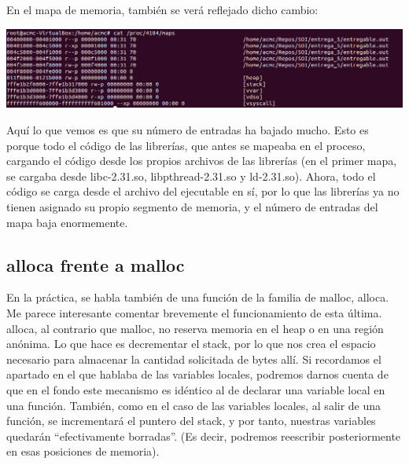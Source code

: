 \documentclass[a4paper]{article}
\begin{document}
En el mapa de memoria, también se verá reflejado dicho cambio:

\includegraphics[scale=0.408]{Captura_estatico.png}

Aquí lo que vemos es que su número de entradas ha bajado mucho. Esto es porque todo el código de las librerías, que antes se mapeaba en el proceso, cargando el código desde los propios archivos de las librerías (en el primer mapa, se cargaba desde {\ttfamily libc-2.31.so}, {\ttfamily libpthread-2.31.so} y {\ttfamily ld-2.31.so}). Ahora, todo el código se carga desde el archivo del ejecutable en sí, por lo que las librerías ya no tienen asignado su propio segmento de memoria, y el número de entradas del mapa baja enormemente.

\subsection{{\ttfamily alloca} frente a {\ttfamily malloc}}

En la práctica, se habla también de una función de la familia de {\ttfamily malloc}, {\ttfamily alloca}. Me parece interesante comentar brevemente el funcionamiento de esta última. {\ttfamily alloca}, al contrario que {\ttfamily malloc}, no reserva memoria en el heap o en una región anónima. Lo que hace es decrementar el stack, por lo que nos crea el espacio necesario para almacenar la cantidad solicitada de bytes allí. Si recordamos el apartado en el que hablaba de las variables locales, podremos darnos cuenta de que en el fondo este mecanismo es idéntico al de declarar una variable local en una función. También, como en el caso de las variables locales, al salir de una función, se incrementará el puntero del stack, y por tanto, nuestras variables quedarán ``efectivamente borradas''. (Es decir, podremos reescribir posteriormente en esas posiciones de memoria).
\end{document}
